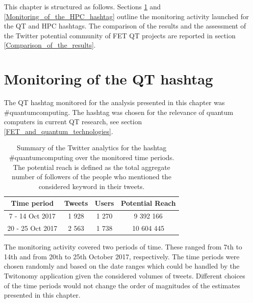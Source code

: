 This chapter is structured as follows. Sections \ref{Monitoring_of_the_QT_hashtag} and \ref{Monitoring_of_the_HPC_hashtag} outline the monitoring activity launched for the QT and HPC hashtags. The comparison of the results and the assessment of the Twitter potential community of FET QT projects are reported in section \ref{Comparison_of_the_results}. 

\section{Monitoring of the QT hashtag} \label{Monitoring_of_the_QT_hashtag}
The QT hashtag monitored for the analysis presented in this chapter was \#quantumcomputing. The hashtag was chosen for the relevance of quantum computers in current QT research, see section \ref{FET_and_quantum_technologies}. 

\begin{table}[t]
 \begin{center}
  \begin{tabular}{cccc}
   \hline 
   \hline
   Time period & Tweets & Users & Potential Reach \\ 
   \hline
   \hline
   7 - 14 Oct 2017 & 1 928 & 1 270 & 9 392 166  \\
   20 - 25 Oct 2017 & 2 563 & 1 738 & 10 604 445  \\
   \hline
   \hline
  \end{tabular}
 \end{center} 
 \caption{Summary of the Twitter analytics for the hashtag \#quantumcomputing over the monitored time periods. The potential reach is defined as the total aggregate number of followers of the people who mentioned the considered keyword in their tweets.}
\label{Summary_QuantumComputing} 
\end{table}

The monitoring activity covered two periods of time. These ranged from 7th to 14th and from 20th to 25th October 2017, respectively. The time periods were chosen randomly and based on the date ranges which could be handled by the Twitonomy application given the considered volumes of tweets. Different choices of the time periods would not change the order of magnitudes of the estimates presented in this chapter.

